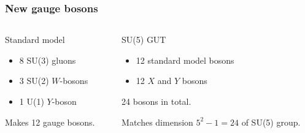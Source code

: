 \documentclass[english, fleqn]{beamer}
\begin{document}
\begin{frame}
    \frametitle{New gauge bosons}

    \begin{columns}
        \begin{column}{.5\linewidth}
            \begin{block}{Standard model}
                \begin{itemize}
                    \item 8 SU(3) gluons
                    \item 3 SU(2) $W$-bosons
                    \item 1 U(1) $Y$-boson
                \end{itemize}

                Makes 12 gauge bosons.
            \end{block}
        \end{column}
        \pause
        \begin{column}{.5\linewidth}
            \begin{block}{SU(5) GUT}
                \begin{itemize}
                    \item 12 standard model bosons
                    \item 12 $X$ and $Y$ bosons
                \end{itemize}

                24 bosons in total.

                Matches dimension $5^2 - 1 = 24$ of SU(5) group.
            \end{block}
        \end{column}
    \end{columns}


\end{frame}
\end{document}
